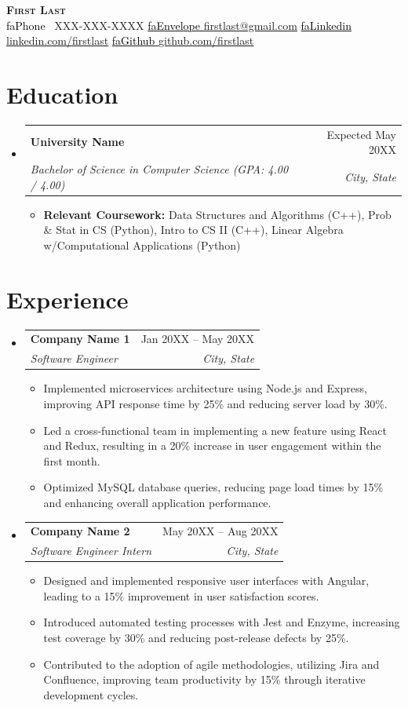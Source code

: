 \documentclass[letterpaper,11pt]{article}
\makeatletter
\newcommand{\resumeItem}[1]{
  \item\small{
    {#1 \vspace{-2pt}}
  }
}
\newcommand{\resumeSubheading}[4]{
  \vspace{-2pt}\item
    \begin{tabular*}{0.97\textwidth}[t]{l@{\extracolsep{\fill}}r}
      \textbf{#1} & #2 \\
      \textit{\small#3} & \textit{\small #4} \\
    \end{tabular*}\vspace{-7pt}
}
\newcommand{\resumeSubHeadingListStart}{\begin{itemize}[leftmargin=0.15in, label={}]}
\newcommand{\resumeSubHeadingListEnd}{\end{itemize}}
\newcommand{\resumeItemListStart}{\begin{itemize}}
\newcommand{\resumeItemListEnd}{\end{itemize}\vspace{-5pt}}
\newcommand{\seticon}[1]{\textcolor{Black}{\csname #1\endcsname}}
\makeatother
\begin{document}
\begin{center}
    \textbf{\Huge \scshape First Last} \\ \vspace{1pt}
    \seticon{faPhone} \ \small XXX-XXX-XXXX \quad
    \href{mailto:firstlast@gmail.com}{\seticon{faEnvelope} \underline{firstlast@gmail.com}} \quad
    \href{https://www.linkedin.com/in/}{\seticon{faLinkedin} \underline{linkedin.com/firstlast}} \quad
    \href{https://github.com/}{\seticon{faGithub} \underline{github.com/firstlast}}
\end{center}

\section{Education}
  \resumeSubHeadingListStart
    \resumeSubheading
      {University Name}{Expected May 20XX}
      {Bachelor of Science in Computer Science (GPA: 4.00 / 4.00)}{City, State}
      \resumeItemListStart
        \resumeItem{\textbf{Relevant Coursework:} Data Structures and Algorithms (C++), Prob \& Stat in CS (Python), Intro to CS II (C++), Linear Algebra w/Computational Applications (Python)}
      \resumeItemListEnd
  \resumeSubHeadingListEnd

\section{Experience}
  \resumeSubHeadingListStart
    \resumeSubheading
      {Company Name 1}{Jan 20XX -- May 20XX}
      {Software Engineer}{City, State}
      \resumeItemListStart
        \resumeItem{Implemented microservices architecture using Node.js and Express, improving API response time by 25\% and reducing server load by 30\%.}
        \resumeItem{Led a cross-functional team in implementing a new feature using React and Redux, resulting in a 20\% increase in user engagement within the first month.}
        \resumeItem{Optimized MySQL database queries, reducing page load times by 15\% and enhancing overall application performance.}
      \resumeItemListEnd
      
    \resumeSubheading
      {Company Name 2}{May 20XX -- Aug 20XX}
      {Software Engineer Intern}{City, State}
      \resumeItemListStart
        \resumeItem{Designed and implemented responsive user interfaces with Angular, leading to a 15\% improvement in user satisfaction scores.}
        \resumeItem{Introduced automated testing processes with Jest and Enzyme, increasing test coverage by 30\% and reducing post-release defects by 25\%.}
        \resumeItem{Contributed to the adoption of agile methodologies, utilizing Jira and Confluence, improving team productivity by 15\% through iterative development cycles.}
      \resumeItemListEnd
  \resumeSubHeadingListEnd
\end{document}

